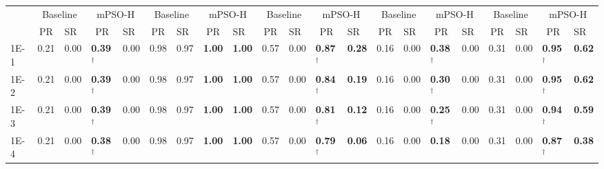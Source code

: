 \begin{table*}[h]
{\begin{tabular}{|p{4.8mm}|p{4.6mm}|p{4.6mm}|p{4.6mm}|p{4.6mm}|p{4.6mm}|p{4.6mm}|p{4.6mm}|p{4.6mm}|p{4.6mm}|p{4.6mm}|p{4.6mm}|p{4.6mm}|p{4.6mm}|p{4.6mm}|p{4.6mm}|p{4.6mm}|p{4.6mm}|p{4.6mm}|p{4.6mm}|p{4.6mm}|}
    \cline{2-21}
    & \multicolumn{2}{c|}{Baseline} & \multicolumn{2}{c|}{mPSO-H} & \multicolumn{2}{c|}{Baseline} & \multicolumn{2}{c|}{mPSO-H} & \multicolumn{2}{c|}{Baseline} & \multicolumn{2}{c|}{mPSO-H} & \multicolumn{2}{c|}{Baseline} & \multicolumn{2}{c|}{mPSO-H} & \multicolumn{2}{c|}{Baseline} & \multicolumn{2}{c|}{mPSO-H} \\

    \cline{2-21}
     & \multicolumn{1}{c|}{PR} & SR & \multicolumn{1}{c|}{PR} & SR & \multicolumn{1}{c|}{PR} & SR & \multicolumn{1}{c|}{PR} & SR & \multicolumn{1}{c|}{PR} & SR & \multicolumn{1}{c|}{PR} & SR & \multicolumn{1}{c|}{PR} & SR & \multicolumn{1}{c|}{PR} & SR & \multicolumn{1}{c|}{PR} & SR & \multicolumn{1}{c|}{PR} & SR \\
    \hline
    1E-1 & 0.21 & 0.00 & \textcolor{customblue}{\textbf{0.39$^\dagger$}} & 0.00 & 0.98 & 0.97 & \textcolor{customblue}{\textbf{1.00}} & \textcolor{customblue}{\textbf{1.00}} & 0.57 & 0.00 & \textcolor{customblue}{\textbf{0.87$^\dagger$}} & \textcolor{customblue}{\textbf{0.28}} & 0.16 & 0.00 & \textcolor{customblue}{\textbf{0.38$^\dagger$}} & 0.00 & 0.31 & 0.00 & \textcolor{customblue}{\textbf{0.95$^\dagger$}} & \textcolor{customblue}{\textbf{0.62}} \\
    1E-2 & 0.21 & 0.00 & \textcolor{customblue}{\textbf{0.39$^\dagger$}} & 0.00 & 0.98 & 0.97 & \textcolor{customblue}{\textbf{1.00}} & \textcolor{customblue}{\textbf{1.00}} & 0.57 & 0.00 & \textcolor{customblue}{\textbf{0.84$^\dagger$}} & \textcolor{customblue}{\textbf{0.19}} & 0.16 & 0.00 & \textcolor{customblue}{\textbf{0.30$^\dagger$}} & 0.00 & 0.31 & 0.00 & \textcolor{customblue}{\textbf{0.95$^\dagger$}} & \textcolor{customblue}{\textbf{0.62}} \\
    1E-3 & 0.21 & 0.00 & \textcolor{customblue}{\textbf{0.39$^\dagger$}} & 0.00 & 0.98 & 0.97 & \textcolor{customblue}{\textbf{1.00}} & \textcolor{customblue}{\textbf{1.00}} & 0.57 & 0.00 & \textcolor{customblue}{\textbf{0.81$^\dagger$}} & \textcolor{customblue}{\textbf{0.12}} & 0.16 & 0.00 & \textcolor{customblue}{\textbf{0.25$^\dagger$}} & 0.00 & 0.31 & 0.00 & \textcolor{customblue}{\textbf{0.94$^\dagger$}} & \textcolor{customblue}{\textbf{0.59}} \\
    1E-4 & 0.21 & 0.00 & \textcolor{customblue}{\textbf{0.38$^\dagger$}} & 0.00 & 0.98 & 0.97 & \textcolor{customblue}{\textbf{1.00}} & \textcolor{customblue}{\textbf{1.00}} & 0.57 & 0.00 & \textcolor{customblue}{\textbf{0.79$^\dagger$}} & \textcolor{customblue}{\textbf{0.06}} & 0.16 & 0.00 & \textcolor{customblue}{\textbf{0.18}} & 0.00 & 0.31 & 0.00 & \textcolor{customblue}{\textbf{0.87$^\dagger$}} & \textcolor{customblue}{\textbf{0.38}} \\

\end{tabular}}
\end{table*}
